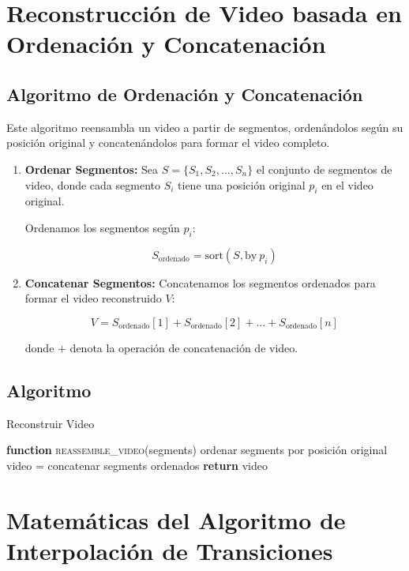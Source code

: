 \documentclass{article}
\begin{document}
\section*{Reconstrucción de Video basada en Ordenación y Concatenación}

\subsection*{Algoritmo de Ordenación y Concatenación}

Este algoritmo reensambla un video a partir de segmentos, ordenándolos según su posición original y concatenándolos para formar el video completo.

\begin{enumerate}
    \item \textbf{Ordenar Segmentos:} Sea \( S = \{S_1, S_2, \ldots, S_n\} \) el conjunto de segmentos de video, donde cada segmento \( S_i \) tiene una posición original \( p_i \) en el video original.
    
    Ordenamos los segmentos según \( p_i \):
    
    \[
    S_{\text{ordenado}} = \text{sort}(S, \text{by} \ p_i)
    \]
    
    \item \textbf{Concatenar Segmentos:} Concatenamos los segmentos ordenados para formar el video reconstruido \( V \):
    
    \[
    V = S_{\text{ordenado}}[1] + S_{\text{ordenado}}[2] + \ldots + S_{\text{ordenado}}[n]
    \]
    
    donde \( + \) denota la operación de concatenación de video.
\end{enumerate}

\subsection*{Algoritmo}
\begin{algorithm}
\caption{Reconstruir Video}
\begin{algorithmic}[1]
\STATE \textbf{function} \textsc{reassemble\_video}(segments)
\STATE \quad ordenar segments por posición original
\STATE \quad video = concatenar segments ordenados
\STATE \quad \textbf{return} video
\end{algorithmic}
\end{algorithm}

\section*{Matemáticas del Algoritmo de Interpolación de Transiciones}
\end{document}
